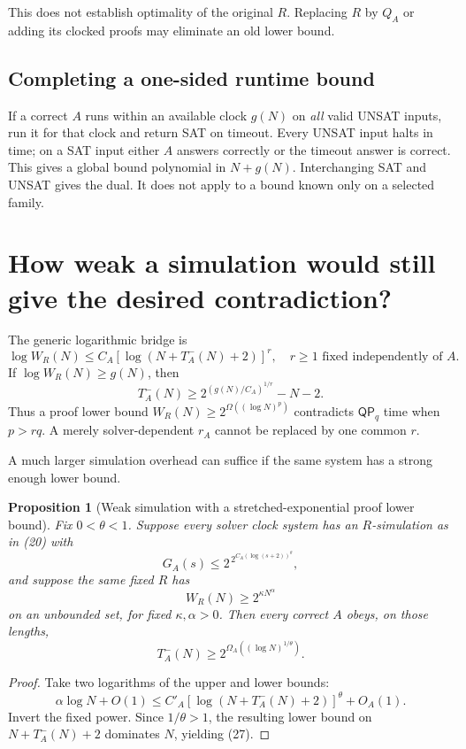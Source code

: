 \documentclass[11pt]{article}
\newtheorem{proposition}{Proposition}
\newcommand{\QP}{\mathsf{QP}}
\begin{document}
This does not establish optimality of the original $R$. Replacing $R$
by $Q_A$ or adding its clocked proofs may eliminate an old lower bound.

\subsection{Completing a one-sided runtime bound}
If a correct $A$ runs within an available clock $g(N)$ on \emph{all}
valid UNSAT inputs, run it for that clock and return SAT on timeout.
Every UNSAT input halts in time; on a SAT input either $A$ answers correctly
or the timeout answer is correct. This gives a global bound polynomial in
$N+g(N)$. Interchanging SAT and UNSAT gives the dual.
It does not apply to a bound known only on a selected family.

\section{How weak a simulation would still give the desired contradiction?}

The generic logarithmic bridge is
\[
 \log W_R(N)\le
 C_A[\log(N+T_A^-(N)+2)]^r,
 \quad r\ge1\text{ fixed independently of }A.
 \tag{23}
\]
If $\log W_R(N)\ge g(N)$, then
\[
 T_A^-(N)\ge
 2^{(g(N)/C_A)^{1/r}}-N-2.
 \tag{24}
\]
Thus a proof lower bound
$W_R(N)\ge2^{\Omega((\log N)^p)}$ contradicts $\QP_q$ time when $p>rq$.
A merely solver-dependent $r_A$ cannot be replaced by one common $r$.

A much larger simulation overhead can suffice if the same system has a
strong enough lower bound.

\begin{proposition}[Weak simulation with a stretched-exponential proof lower bound]
Fix $0<\theta<1$. Suppose every solver clock system has an $R$-simulation
as in (20) with
\[
 G_A(s)\le2^{\,2^{C_A(\log(s+2))^\theta}},
 \tag{25}
\]
and suppose the same fixed $R$ has
\[
 W_R(N)\ge2^{\kappa N^\alpha}
 \tag{26}
\]
on an unbounded set, for fixed $\kappa,\alpha>0$.
Then every correct $A$ obeys, on those lengths,
\[
 T_A^-(N)\ge
 2^{\Omega_A((\log N)^{1/\theta})}.
 \tag{27}
\]
\end{proposition}

\begin{proof}
Take two logarithms of the upper and lower bounds:
\[
 \alpha\log N+O(1)
 \le C'_A[\log(N+T_A^-(N)+2)]^\theta+O_A(1).
\]
Invert the fixed power. Since $1/\theta>1$, the resulting lower bound on
$N+T_A^-(N)+2$ dominates $N$, yielding (27).
\end{proof}
\end{document}
